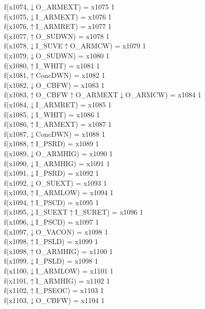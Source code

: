 f(x1074,$\downarrow$O\_ARMEXT) = x1075 {1} \\
f(x1075,$\downarrow$I\_ARMEXT) = x1076 {1} \\
f(x1076,$\uparrow$I\_ARMRET) = x1077 {1} \\
f(x1077,$\uparrow$O\_SUDWN) = x1078 {1} \\
f(x1078,$\downarrow$I\_SUVE$\uparrow$O\_ARMCW) = x1079 {1} \\
f(x1079,$\downarrow$O\_SUDWN) = x1080 {1} \\
f(x1080,$\uparrow$I\_WHIT) = x1081 {1} \\
f(x1081,$\uparrow$ConcDWN) = x1082 {1} \\
f(x1082,$\downarrow$O\_CBFW) = x1083 {1} \\
f(x1083,$\uparrow$O\_CBFW$\uparrow$O\_ARMEXT$\downarrow$O\_ARMCW) = x1084 {1} \\
f(x1084,$\downarrow$I\_ARMRET) = x1085 {1} \\
f(x1085,$\downarrow$I\_WHIT) = x1086 {1} \\
f(x1086,$\uparrow$I\_ARMEXT) = x1087 {1} \\
f(x1087,$\downarrow$ConcDWN) = x1088 {1} \\
f(x1088,$\uparrow$I\_PSRD) = x1089 {1} \\
f(x1089,$\downarrow$O\_ARMHIG) = x1090 {1} \\
f(x1090,$\downarrow$I\_ARMHIG) = x1091 {1} \\
f(x1091,$\downarrow$I\_PSRD) = x1092 {1} \\
f(x1092,$\downarrow$O\_SUEXT) = x1093 {1} \\
f(x1093,$\uparrow$I\_ARMLOW) = x1094 {1} \\
f(x1094,$\uparrow$I\_PSCD) = x1095 {1} \\
f(x1095,$\downarrow$I\_SUEXT$\uparrow$I\_SURET) = x1096 {1} \\
f(x1096,$\downarrow$I\_PSCD) = x1097 {1} \\
f(x1097,$\downarrow$O\_VACON) = x1098 {1} \\
f(x1098,$\uparrow$I\_PSLD) = x1099 {1} \\
f(x1098,$\uparrow$O\_ARMHIG) = x1100 {1} \\
f(x1099,$\downarrow$I\_PSLD) = x1098 {1} \\
f(x1100,$\downarrow$I\_ARMLOW) = x1101 {1} \\
f(x1101,$\uparrow$I\_ARMHIG) = x1102 {1} \\
f(x1102,$\uparrow$I\_PSEOC) = x1103 {1} \\
f(x1103,$\downarrow$O\_CBFW) = x1104 {1} \\
